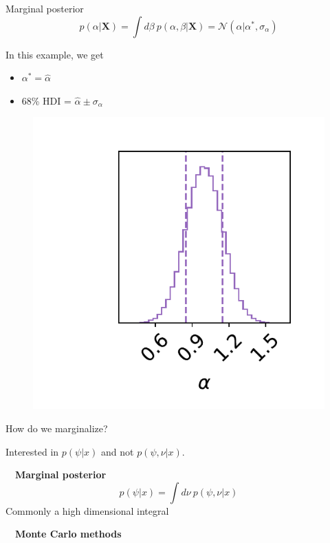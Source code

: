 \documentclass[
aspectratio=169,
14pt,
professionalfonts
]{beamer}
\newcommand{\arrow}{~\ding{220}~}
\begin{document}
\begin{frame}{Marginal posterior}
\vspace{-1cm}
    $$p(\alpha|\boldsymbol{X}) = \int d\beta ~ p(\alpha, \beta|\boldsymbol{X}) = \mathcal{N}(\alpha | \alpha^*, \sigma_{\alpha})$$
    \begin{minipage}{0.4\linewidth}
    In this example, we get
        \begin{itemize}
            \item $\alpha^* = \hat \alpha$
            \item 68\% HDI = $\hat \alpha \pm \sigma_{\alpha}$
        \end{itemize}
    \end{minipage}
    \begin{minipage}{0.59\linewidth}
    \begin{figure}
        \centering
        \includegraphics[width=0.7\linewidth]{../plots/marginal_posterior.pdf}
    \end{figure}
    \end{minipage}
\end{frame}

\begin{frame}{How do we marginalize?}
    \begin{center}
        Interested in $p(\psi | x)$ and not $p(\psi, \nu | x)$.
    \end{center}

    \arrow \textbf{Marginal posterior}
    $$
    p(\psi | x) = \int d\nu ~ p(\psi, \nu | x)
    $$
    Commonly a high dimensional integral 
    \begin{center}
        \arrow \textbf{Monte Carlo methods}
    \end{center}
\end{frame}
\end{document}
